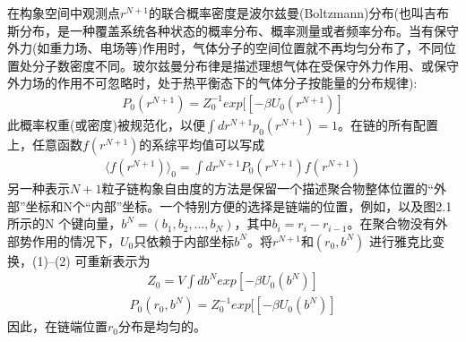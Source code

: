 在构象空间中观测点$r^{N+1}$的联合概率密度是波尔兹曼(Boltzmann)分布(也叫吉布斯分布，是一种覆盖系统各种状态的概率分布、概率测量或者频率分布。当有保守外力(如重力场、电场等)作用时，气体分子的空间位置就不再均匀分布了，不同位置处分子数密度不同。玻尔兹曼分布律是描述理想气体在受保守外力作用、或保守外力场的作用不可忽略时，处于热平衡态下的气体分子按能量的分布规律):\\
\begin{gather}
P_0(r^{N+1})=Z_{0}^{-1}exp[[-\beta U_{0}(r^{N+1})]
\end{gather}
此概率权重(或密度)被规范化，以便$\int dr^{N+1}p_0(r^{N+1})=1$。在链的所有配置上，任意函数$f(r^{N+1})$的系综平均值可以写成\\
\begin{gather}
\langle f(r^{N+1})\rangle _0 =  \int dr^{N+1}P_0(r^{N+1})f(r^{N+1})
\end{gather}
另一种表示$N+1$粒子链构象自由度的方法是保留一个描述聚合物整体位置的“外部”坐标和N个“内部”坐标。一个特别方便的选择是链端的位置，例如，以及图2.1所示的N 个键向量，$b^{N}=(b_1,b_2,\ldots,b_{N})$，其中$b_{i}=r_{i}-r_{i-1}$。在聚合物没有外部势作用的情况下，$U_0$只依赖于内部坐标$b^{N}$。将$r^{N+1}$和$(r_0,b^{N})$ 进行雅克比变换，(1)–(2) 可重新表示为\\
\begin{gather}
Z_0 = V \int db^{N}exp[-\beta U_{0}(b^{N})]
\end{gather}
\begin{gather}
P_0(r_0,b^{N})=Z_{0}^{-1}exp[[-\beta U_{0}(b^{N})]
\end{gather}
因此，在链端位置$r_0$分布是均匀的。\\

